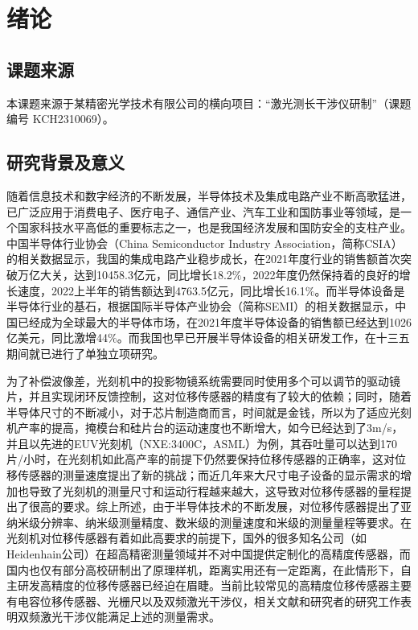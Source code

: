 \chapter{绪论}

\section{课题来源}
本课题来源于某精密光学技术有限公司的横向项目：“激光测长干涉仪研制”（课题编号 KCH2310069）。

\section{研究背景及意义}
随着信息技术和数字经济的不断发展，半导体技术及集成电路产业不断高歌猛进，已广泛应用于消费电子、医疗电子、通信产业、汽车工业和国防事业等领域，是一个国家科技水平高低的重要标志之一，也是我国经济发展和国防安全的支柱产业。中国半导体行业协会（China Semiconductor Industry Association，简称CSIA）的相关数据显示，我国的集成电路产业稳步成长，在2021年度行业的销售额首次突破万亿大关，达到10458.3亿元，同比增长18.2$\%$，2022年度仍然保持着的良好的增长速度，2022上半年的销售额达到4763.5亿元，同比增长16.1$\%$\cite{csia1}。而半导体设备是半导体行业的基石，根据国际半导体产业协会（简称SEMI）的相关数据显示，中国已经成为全球最大的半导体市场，在2021年度半导体设备的销售额已经达到1026亿美元，同比激增44$\%$\cite{中国再次成为全球最大半导体设备市场}。而我国也早已开展半导体设备的相关研发工作，在十三五期间就已进行了单独立项研究。

为了补偿波像差，光刻机中的投影物镜系统需要同时使用多个可以调节的驱动镜片，并且实现闭环反馈控制，这对位移传感器的精度有了较大的依赖；同时，随着半导体尺寸的不断减小，对于芯片制造商而言，时间就是金钱，所以为了适应光刻机产率的提高，掩模台和硅片台的运动速度也不断增大，如今已经达到了3m/s，并且以先进的EUV光刻机（NXE:3400C，ASML）为例，其吞吐量可以达到170片/小时，在光刻机如此高产率的前提下仍然要保持位移传感器的正确率，这对位移传感器的测量速度提出了新的挑战；而近几年来大尺寸电子设备的显示需求的增加也导致了光刻机的测量尺寸和运动行程越来越大，这导致对位移传感器的量程提出了很高的要求。综上所述，由于半导体技术的不断发展，对位移传感器提出了亚纳米级分辨率、纳米级测量精度、数米级的测量速度和米级的测量量程等要求。在光刻机对位移传感器有着如此高要求的前提下，国外的很多知名公司（如Heidenhain公司）在超高精密测量领域并不对中国提供定制化的高精度传感器，而国内也仅有部分高校研制出了原理样机，距离实用还有一定距离，在此情形下，自主研发高精度的位移传感器已经迫在眉睫。当前比较常见的高精度位移传感器主要有电容位移传感器、光栅尺以及双频激光干涉仪，相关文献和研究者的研究工作表明双频激光干涉仪能满足上述的测量需求\cite{2022reso1ution,张志平2022激光外差干涉技术在光刻机中的应用,于海娇2022双频激光干涉仪的应用研究综述,2007Studyon,2021Microchip,202019picometer}。

